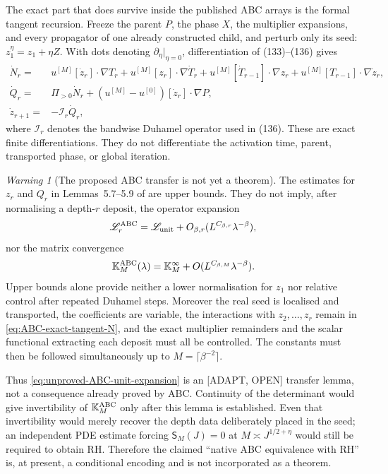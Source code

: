 \documentclass[11pt]{amsart}
\numberwithin{equation}{section}
\theoremstyle{plain}
\theoremstyle{definition}
\theoremstyle{remark}
\newtheorem{warning}[theorem]{Warning}
\begin{document}
The exact part that does survive inside the published ABC arrays is the
formal tangent recursion.  Freeze the parent $P$, the phase $X$, the
multiplier expansions, and every propagator of one already constructed
child, and perturb only its seed: $z_1^\eta=z_1+\eta Z$.  With dots denoting
$\partial_\eta|_{\eta=0}$, differentiation of (133)--(136) gives
\begin{align}
 \dot N_r={}&u^{[M]}[\dot z_r]\cdot\nabla T_r
 +u^{[M]}[z_r]\cdot\nabla\dot T_r
 +u^{[M]}[\dot T_{r-1}]\cdot\nabla z_r
 +u^{[M]}[T_{r-1}]\cdot\nabla\dot z_r,
\label{eq:ABC-exact-tangent-N}\\
 \dot Q_r={}&\Pi_{>0}\dot N_r
 +(u^{[M]}-u^{[0]})[\dot z_r]\cdot\nabla P,
\label{eq:ABC-exact-tangent-Q}\\
 \dot z_{r+1}={}&-\mathcal I_r\dot Q_r,
\label{eq:ABC-exact-tangent-z}
\end{align}
where $\mathcal I_r$ denotes the bandwise Duhamel operator used in (136).
These are exact finite differentiations.  They do not differentiate the
activation time, parent, transported phase, or global iteration.

\begin{warning}[The proposed ABC transfer is not yet a theorem]
\label{warn:depth-transfer-open}
The estimates for $z_r$ and $Q_r$ in Lemmas~5.7--5.9 of
\cite{AlpogeBuckmasterCoiculescu2026} are upper bounds.  They do not imply,
after normalising a depth-$r$ deposit, the operator expansion
\begin{equation}
 \mathscr L_r^{\rm ABC}=\mathscr L_{\rm unit}
 +O_{\beta,r}(L^{C_{\beta,r}}\lambda^{-\beta}),
\label{eq:unproved-ABC-unit-expansion}
\end{equation}
nor the matrix convergence
\begin{equation}
 \mathbb K_M^{\rm ABC}(\lambda)
 =\mathbb K_M^\infty+O(L^{C_{\beta,M}}\lambda^{-\beta}).
\label{eq:unproved-ABC-matrix-convergence}
\end{equation}
Upper bounds alone provide neither a lower normalisation for $z_1$ nor
relative control after repeated Duhamel steps.  Moreover the real seed is
localised and transported, the coefficients are variable, the interactions
with $z_2,\ldots,z_r$ remain in \eqref{eq:ABC-exact-tangent-N}, and the exact
multiplier remainders and the scalar functional extracting each deposit must
all be controlled.  The constants must then be followed simultaneously up
to $M=\lceil\beta^{-2}\rceil$.

Thus \eqref{eq:unproved-ABC-unit-expansion} is an \textup{[ADAPT, OPEN]}
transfer lemma, not a consequence already proved by ABC.  Continuity of the
determinant would give invertibility of $\mathbb K_M^{\rm ABC}$ only after
this lemma is established.  Even that invertibility would merely recover the
depth data deliberately placed in the seed; an independent PDE estimate
forcing $\mathsf S_M(J)=0$ at $M\asymp J^{1/2+\eta}$ would still be required
to obtain RH.  Therefore the claimed ``native ABC equivalence with RH'' is,
at present, a conditional encoding and is not incorporated as a theorem.
\end{warning}
\end{document}
